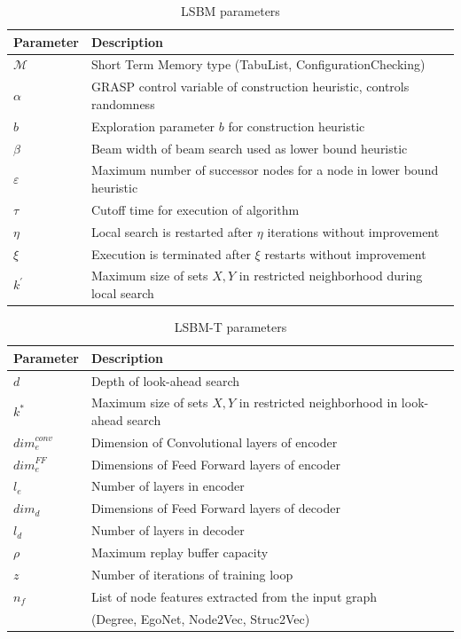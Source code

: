 \documentclass[draft,final]{vutinfth} %
\begin{document}
\begin{table}
    \centering
    \begin{tabular}{ll}
        \hline
        Parameter & Description \\ \hline
        $\mathcal{M}$ & Short Term Memory type (TabuList, ConfigurationChecking) \\
        $\alpha$ & GRASP control variable of construction heuristic, controls randomness \\
        $b$ & Exploration parameter $b$ for construction heuristic \\
        $\beta$ & Beam width of beam search used as lower bound heuristic \\
        $\varepsilon$ & Maximum number of successor nodes for a node in lower bound heuristic \\
        $\tau$ & Cutoff time for execution of algorithm \\
        $\eta$ & Local search is restarted after $\eta$ iterations without improvement \\
        $\xi$ & Execution is terminated after $\xi$ restarts without improvement \\
        $k^\prime$ & Maximum size of sets $X, Y$ in restricted neighborhood during local search 
    \end{tabular}
    \caption{LSBM parameters}
    \label{tab:parameters-lsbm}
\end{table}

\begin{table}
    \centering
    \begin{tabular}{ll}
        \hline
        Parameter & Description \\ \hline
        $d$ & Depth of look-ahead search \\
        $k^*$ & Maximum size of sets $X,Y$ in restricted neighborhood in look-ahead search \\
        $\mathit{dim}^{\mathit{conv}}_e$ & Dimension of Convolutional layers of encoder \\
        $\mathit{dim}^{\mathit{FF}}_e$ & Dimensions of Feed Forward layers of encoder \\
        $l_e$ & Number of layers in encoder \\
        $\mathit{dim}_d$ & Dimensions of Feed Forward layers of decoder \\
        $l_d$ & Number of layers in decoder \\
        $\rho$ & Maximum replay buffer capacity \\
        $z$ & Number of iterations of training loop \\
        $n_f$ & List of node features extracted from the input graph  \\
        & (Degree, EgoNet, Node2Vec, Struc2Vec)
    \end{tabular}
    \caption{LSBM-T parameters}
    \label{tab:parameters-lsbm-t}
\end{table}
\end{document}
